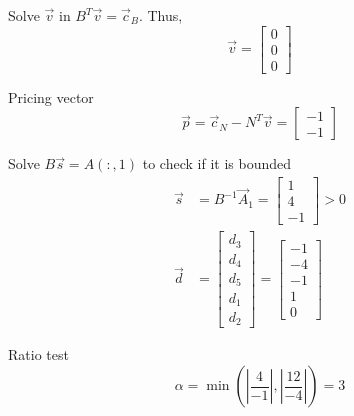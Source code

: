 \documentclass[a4paper,10pt]{article}
\begin{document}
\begin{enumerate}
\begin{enumerate}
{\begin{enumerate}
                    Solve $\vec{v}$ in $B^T\vec{v} = \vec{c}_B$. Thus, 
                    \[
                        \vec{v} = \begin{bmatrix} 0 \\ 0 \\ 0 \end{bmatrix}
                    \]

                    Pricing vector 
                    \[
                        \vec{p} = \vec{c}_N - N^T\vec{v} = \begin{bmatrix} -1 \\ -1 \end{bmatrix}
                    \]

                    Solve $B\vec{s}=A(:,1)$ to check if it is bounded
                    \begin{align}
                        \vec{s} &= B^{-1}\vec{A}_1 = \begin{bmatrix} 1 \\ 4 \\ -1 \end{bmatrix} > 0 \\
                        \vec{d} &= \begin{bmatrix} d_3 \\ d_4 \\ d_5 \\ d_1 \\ d_2 \end{bmatrix} = \begin{bmatrix} -1 \\ -4 \\ -1 \\ 1 \\ 0 \end{bmatrix}
                    \end{align}

                    Ratio test 
                    \[
                        \alpha = \min(|\frac{4}{-1}|, |\frac{12}{-4}|) = 3
                    \]


\end{enumerate}}
\end{enumerate}
\end{enumerate}
\end{document}
